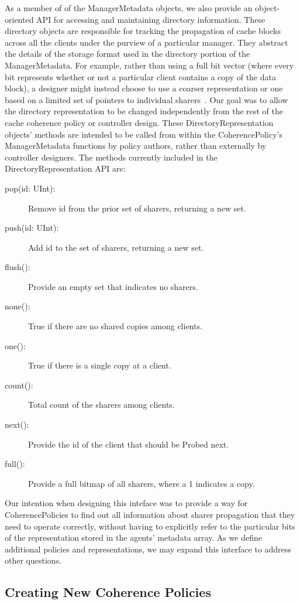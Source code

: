 As a member of of the ManagerMetadata objects,
we also provide an object-oriented API for accessing and maintaining directory information.
These directory objects are responsible for tracking the propagation of cache blocks
across all the clients under the purview of a particular manager.
They abstract the details of the storage format used in the directory portion of the ManagerMetadata.
For example, rather than using a full bit vector (where every bit represents whether or not a particular client contains a copy of the data block),
a designer might instead choose to use a coarser representation
or one based on a limited set of pointers to individual sharers~\cite{sorin2011primer}.
Our goal was to allow the directory representation to be changed independently from
the rest of the cache coherence policy or controller design.
These DirectoryRepresentation objects' methods are intended to be called
from within the CoherencePolicy's ManagerMetadata functions by policy authors,
rather than externally by controller designers.
The methods currently included in the DirectoryRepresentation API are:
\begin{description}
\item[pop(id: UInt):] Remove id from the prior set of sharers, returning a new set.
\item[push(id: UInt):] Add id to the set of sharers, returning a new set.
\item[flush():] Provide an empty set that indicates no sharers.
\item[none():] True if there are no shared copies among clients.
\item[one():] True if there is a single copy at a client.
\item[count():] Total count of the sharers among clients.
\item[next():] Provide the id of the client that should be Probed next.
\item[full():] Provide a full bitmap of all sharers, where a 1 indicates a copy.
\end{description}

Our intention when designing this inteface was to provide a way for CoherencePolicies
to find out all information about sharer propagation that they need to operate correctly,
without having to explicitly refer to the particular bits of the representation
stored in the agents' metadata array.
As we define additional policies and representations,
we may expand this interface to address other questions.

\subsection{Creating New Coherence Policies}

